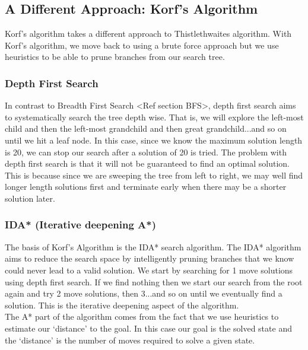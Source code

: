 \documentclass[titlepage]{report}[12pt]
\begin{document}
\subsection{A Different Approach: Korf's Algorithm}
Korf's algorithm takes a different approach to Thistlethwaites algorithm. With Korf's algorithm, we move back to using a brute force approach but we use heuristics to  be able to prune branches from our search tree. 

\subsubsection{Depth First Search}
In contrast to Breadth First Search <Ref section BFS>, depth first search aims to systematically search the tree depth wise. That is, we will explore the left-most child and then the left-most grandchild and then great grandchild...and so on until we hit a leaf node. In this case, since we know the maximum solution length is 20, we can stop our search after a solution of 20 is tried. The problem with depth first search is that it will not be guaranteed to find an optimal solution. This is because since we are sweeping the tree from left to right, we may well find longer length solutions first and terminate early when there may be a shorter solution later.

\subsubsection{IDA* (Iterative deepening A*)}
The basis of Korf's Algorithm is the IDA* search algorithm. The IDA* algorithm aims to reduce the search space by intelligently pruning branches that we know could never lead to a valid solution. We start by searching for 1 move solutions using depth first search. If we find nothing then we start our search from the root again and try 2 move solutions, then 3...and so on until we eventually find a solution. This is the iterative deepening aspect of the algorithm. 
\\
\indent The A* part of the algorithm comes from the fact that we use heuristics to estimate our `distance' to the goal. In this case our goal is the solved state and the `distance' is the number of moves required to solve a given state.
\end{document}
